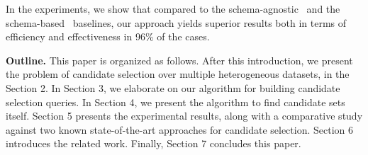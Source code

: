 In the experiments, we show that compared to the schema-agnostic~\cite{papadakis_efficient_2011} and the schema-based~\cite{DBLP:conf/semweb/SongH11} baselines, our approach yields superior results both in terms of efficiency and effectiveness in 96\% of the cases. 

\textbf{Outline.} 
This paper is organized as follows. After this introduction, we present the problem of candidate selection over multiple heterogeneous datasets, in the Section 2. In Section 3, we elaborate on our algorithm for building candidate selection queries. In Section 4, we present the algorithm to find candidate sets itself.  Section 5 presents the experimental results, along with a comparative study against two known state-of-the-art approaches for candidate selection. Section 6 introduces the related work. Finally, Section 7 concludes this paper.
